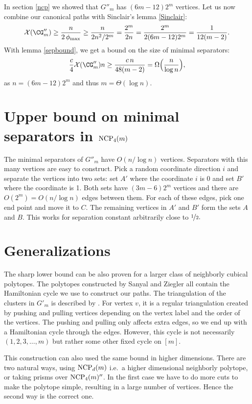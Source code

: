 In section \ref{ncp} we showed that $G''_m$ has $(6m-12)2^m$ vertices. Let us
now combine our canonical paths with Sinclair's lemma \ref{Sinclair}:
\begin{equation}
\mathcal{X}(\CG_m'') 
\ge \frac{n}{2\,\phi_{\max}} 
\ge \frac{n}{2n^2/2^m}
  = \frac{2^m}{2n}
  = \frac{2^m}{2(6m-12)2^m}
  = \frac{1}{12(m-2)}. 
\end{equation}
With lemma \ref{sepbound}, we get a bound on the size of minimal separators:
\begin{equation}
\frac c4 \mathcal{X}(\CG_m'')n 
\ge \frac{c\,n}{48(m-2)} 
 =  \Omega\Big(\frac n{\log n}\Big),
\end{equation}
as $n = (6m-12)2^m$ and thus $m=\Theta(\log n)$.

\section{Upper bound on minimal separators in $\textrm{NCP}_4(m)$}

The minimal separators of $G''_m$ have $O(n/\log n)$ vertices. Separators with this
many vertices are easy to construct. Pick a random coordinate direction $i$ and separate
the vertices into two sets: set $A'$ where the coordinate $i$ is 0 and set $B'$ where the coordinate
is 1. Both sets have $(3m-6)2^m$ vertices and there are $O(2^m) = O(n/\log n)$ edges between them. For each of
these edges, pick one end point and move it to $C$. The remaining vertices in $A'$ and $B'$ form
the sets $A$ and $B$. This works for separation constant arbitrarily close to $\nicefrac{1}{2}.$

\section{Generalizations}

The sharp lower bound can be also proven for a larger class of neighborly cubical polytopes.
The polytopes constructed by Sanyal and Ziegler \cite{Z102} all contain the Hamiltonian
cycle we use to construct our paths. The triangulation of the clusters in $G'_m$ is described by
\cite[Thm 3.7.]{Z102}. For vertex $v$, it is a regular triangulation created by pushing 
and pulling vertices depending on the vertex label and the order of the vertices. 
The pushing and pulling only affects extra edges, so we end up with a Hamiltonian
cycle through the edges. However, this cycle is not necessarily $(1,2,3,\dots,m)$ but
rather some other fixed cycle on $[m]$.

This construction can also used the same bound in higher dimensions. There are two 
natural ways, using $\textrm{NCP}_d(m)$ i.e.\ a higher dimensional neighborly polytope, or 
taking prisms over $\textrm{NCP}_4(m)''$.  In the first case we have to do more cuts to 
make the polytope simple, resulting in a large number of vertices. Hence the 
second way is the correct one. 

